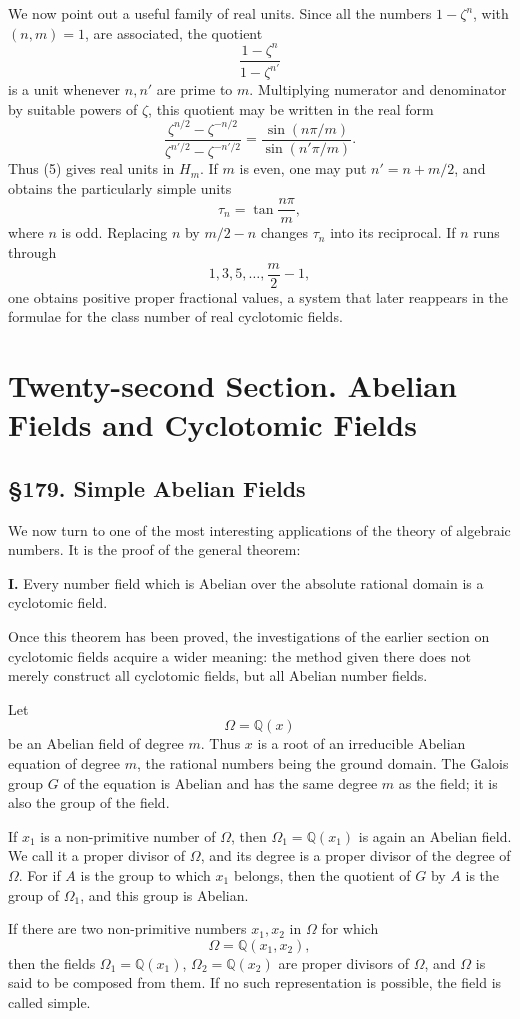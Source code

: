 \documentclass[11pt,a4paper]{book}
\newcommand{\webersection}[2]{\clearpage\section*{\S #1. #2}}
\newcommand{\booktitle}[1]{\clearpage\chapter*{#1}}
\newcommand{\zetaS}{\zeta}
\providecommand{\Hm}{H_m}
\begin{document}
We now point out a useful family of real units.  Since all the numbers \(1-\zetaS^n\), with \((n,m)=1\), are associated, the quotient
\[
  \frac{1-\zetaS^n}{1-\zetaS^{n'}}
\tag{4}
\]
is a unit whenever \(n,n'\) are prime to \(m\).  Multiplying numerator and denominator by suitable powers of \(\zetaS\), this quotient may be written in the real form
\[
  \frac{\zetaS^{n/2}-\zetaS^{-n/2}}{\zetaS^{n'/2}-\zetaS^{-n'/2}}
  =\frac{\sin(n\pi/m)}{\sin(n'\pi/m)}.
\tag{5}
\]
Thus (5) gives real units in \(\Hm\).  If \(m\) is even, one may put \(n'=n+m/2\), and obtains the particularly simple units
\[
  \tau_n=\tan\frac{n\pi}{m},
\tag{6}
\]
where \(n\) is odd.  Replacing \(n\) by \(m/2-n\) changes \(\tau_n\) into its reciprocal.  If \(n\) runs through
\[
  1,3,5,\ldots,\frac m2-1,
\]
one obtains positive proper fractional values, a system that later reappears in the formulae for the class number of real cyclotomic fields.

\booktitle{Twenty-second Section. Abelian Fields and Cyclotomic Fields}

\webersection{179}{Simple Abelian Fields}

We now turn to one of the most interesting applications of the theory of algebraic numbers.  It is the proof of the general theorem:

\textbf{I.} Every number field which is Abelian over the absolute rational domain is a cyclotomic field.

Once this theorem has been proved, the investigations of the earlier section on cyclotomic fields acquire a wider meaning: the method given there does not merely construct all cyclotomic fields, but all Abelian number fields.

Let
\[
  \Omega=\mathbb Q(x)
\]
be an Abelian field of degree \(m\).  Thus \(x\) is a root of an irreducible Abelian equation of degree \(m\), the rational numbers being the ground domain.  The Galois group \(G\) of the equation is Abelian and has the same degree \(m\) as the field; it is also the group of the field.

If \(x_1\) is a non-primitive number of \(\Omega\), then \(\Omega_1=\mathbb Q(x_1)\) is again an Abelian field.  We call it a proper divisor of \(\Omega\), and its degree is a proper divisor of the degree of \(\Omega\).  For if \(A\) is the group to which \(x_1\) belongs, then the quotient of \(G\) by \(A\) is the group of \(\Omega_1\), and this group is Abelian.

If there are two non-primitive numbers \(x_1,x_2\) in \(\Omega\) for which
\[
  \Omega=\mathbb Q(x_1,x_2),
\tag{1}
\]
then the fields \(\Omega_1=\mathbb Q(x_1)\), \(\Omega_2=\mathbb Q(x_2)\) are proper divisors of \(\Omega\), and \(\Omega\) is said to be composed from them.  If no such representation is possible, the field is called simple.
\end{document}
